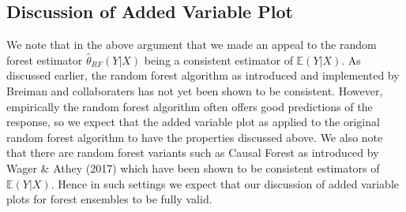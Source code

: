 \documentclass[12pt,twoside]{reedthesis}
\theoremstyle{definition}
\theoremstyle{definition}
\theoremstyle{definition}
\theoremstyle{remark}
\begin{document}
\subsection{Discussion of Added Variable
Plot}\label{discussion-of-added-variable-plot}

We note that in the above argument that we made an appeal to the random
forest estimator \(\hat{\theta}_{RF}(Y|X)\) being a consistent estimator
of \(\mathbb{E}(Y|X)\). As discussed earlier, the random forest
algorithm as introduced and implemented by Breiman and collaboraters has
not yet been shown to be consistent. However, empirically the random
forest algorithm often offers good predictions of the response, so we
expect that the added variable plot as applied to the original random
forest algorithm to have the properties discussed above. We also note
that there are random forest variants such as Causal Forest as
introduced by Wager \& Athey (2017) which have been shown to be
consistent estimators of \(\mathbb{E}(Y|X)\). Hence in such settings we
expect that our discussion of added variable plots for forest ensembles
to be fully valid. \par
\end{document}
